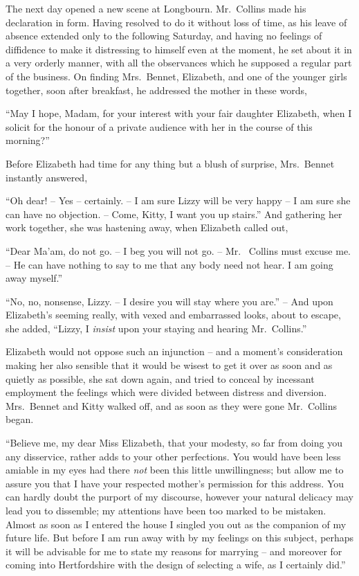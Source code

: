 
The next day opened a new scene at Longbourn.
Mr.\ Collins made his declaration in form. Having resolved
to do it without loss of time, as his leave of absence
extended only to the following Saturday, and having no
feelings of diffidence to make it distressing to himself
even at the moment, he set about it in a very orderly
manner, with all the observances which he supposed a
regular part of the business. On finding Mrs.\ Bennet,
Elizabeth, and one of the younger girls together, soon
after breakfast, he addressed the mother in these words,

“May I hope, Madam, for your interest with your fair
daughter Elizabeth, when I solicit for the honour of a
private audience with her in the course of this morning?”

Before Elizabeth had time for any thing but a blush
of surprise, Mrs.\ Bennet instantly answered,

“Oh dear! -- Yes -- certainly. -- I am sure Lizzy will be
very happy -- I am sure she can have no objection. -- Come,
Kitty, I want you up stairs.” And gathering her work
together, she was hastening away, when Elizabeth called
out,

“Dear Ma’am, do not go. -- I beg you will not go. -- Mr.\ %
Collins must excuse me. -- He can have nothing to
say to me that any body need not hear. I am going away
myself.”

“No, no, nonsense, Lizzy. -- I desire you will stay
where you are.” -- And upon Elizabeth’s seeming really,
with vexed and embarrassed looks, about to escape, she
added, “Lizzy, I \textit{insist} upon your staying and hearing
Mr.\ Collins.”

Elizabeth would not oppose such an injunction -- and
a moment’s consideration making her also sensible that
it would be wisest to get it over as soon and as quietly
as possible, she sat down again, and tried to conceal by
incessant employment the feelings which were divided
between distress and diversion. Mrs.\ Bennet and Kitty
walked off, and as soon as they were gone Mr.\ Collins
began.

“Believe me, my dear Miss Elizabeth, that your
modesty, so far from doing you any disservice, rather
adds to your other perfections. You would have been
less amiable in my eyes had there \textit{not} been this little
unwillingness; but allow me to assure you that I have
your respected mother’s permission for this address.
You can hardly doubt the purport of my discourse,
however your natural delicacy may lead you to dissemble;
my attentions have been too marked to be mistaken.
Almost as soon as I entered the house I singled you out
as the companion of my future life. But before I am run
away with by my feelings on this subject, perhaps it will
be advisable for me to state my reasons for marrying -- and
moreover for coming into Hertfordshire with the
design of selecting a wife, as I certainly did.”

